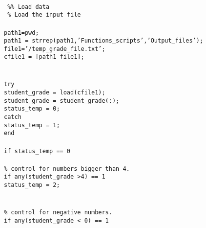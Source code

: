  \begin{mdframed}[hidealllines=true,backgroundcolor=gray!20]
 \begin{singlespace}
 \fontsize{10pt}{1pt}
 \texttt{
\\
{ \color{matlab_green}\%\% Load data}\\
{ \color{matlab_green}\% Load the input file}\\
\\
path1=pwd;\\
path1 = strrep(path1,'Functions\_scripts','Output\_files'); \\
file1='/temp\_grade\_file.txt';\\
cfile1 = [path1 file1];\\
\\
\\
{\color{for_blue}try}\\
\phantom{x}\hspace{5ex} student\_grade = load(cfile1);\\
\phantom{x}\hspace{5ex} student\_grade = student\_grade(:);\\
\phantom{x}\hspace{5ex} status\_temp = 0;\\
{\color{for_blue}catch}\\
\phantom{x}\hspace{5ex} status\_temp = 1;\\
{\color{for_blue}end}\\
\\
{\color{for_blue}if} status\_temp == 0\\
\\
\noindent    
\phantom{x}\hspace{5ex} {\color{matlab_green}\% control for numbers bigger than 4.}\\
\phantom{x}\hspace{5ex} {\color{for_blue}if} any(student\_grade >4) == 1\\ 
\phantom{x}\hspace{10ex} status\_temp = 2;\\
\phantom{x}\\
\\ 
\noindent
\phantom{x}\hspace{5ex} {\color{matlab_green}\% control for negative numbers.}\\
\phantom{x}\hspace{5ex} {\color{for_blue}if} any(student\_grade < 0) == 1\\ 
}
\end{singlespace}
\end{mdframed}
